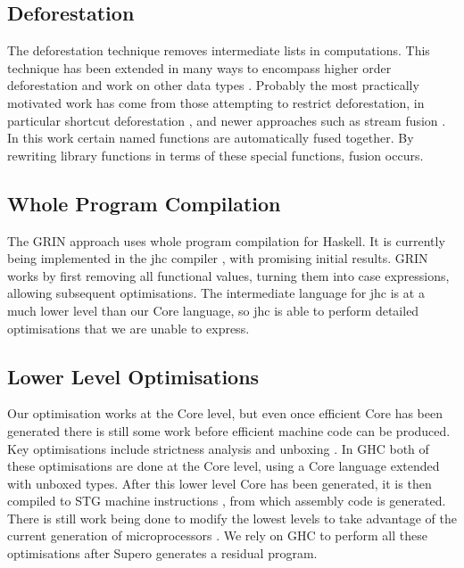 
\subsection{Deforestation}

The deforestation technique \cite{wadler:deforestation} removes intermediate lists in computations. This technique has been extended in many ways to encompass higher order deforestation \cite{marlow:higher_order_deforestation} and work on other data types \cite{coutts:string_fusion}. Probably the most practically motivated work has come from those attempting to restrict deforestation, in particular shortcut deforestation \cite{gill:shortcut_deforestation}, and newer approaches such as stream fusion \cite{coutts:stream_fusion}. In this work certain named functions are automatically fused together. By rewriting library functions in terms of these special functions, fusion occurs.

\subsection{Whole Program Compilation}

The GRIN approach \cite{grin} uses whole program compilation for Haskell. It is currently being implemented in the jhc compiler \cite{jhc}, with promising initial results. GRIN works by first removing all functional values, turning them into case expressions, allowing subsequent optimisations. The intermediate language for jhc is at a much lower level than our Core language, so jhc is able to perform detailed optimisations that we are unable to express.

\subsection{Lower Level Optimisations}

Our optimisation works at the Core level, but even once efficient Core has been generated there is still some work before efficient machine code can be produced. Key optimisations include strictness analysis and unboxing \cite{spj:unboxing}. In GHC both of these optimisations are done at the Core level, using a Core language extended with unboxed types. After this lower level Core has been generated, it is then compiled to STG machine instructions \cite{spj:stg}, from which assembly code is generated. There is still work being done to modify the lowest levels to take advantage of the current generation of microprocessors \cite{marlow:pointer_tagging}. We rely on GHC to perform all these optimisations after Supero generates a residual program.

